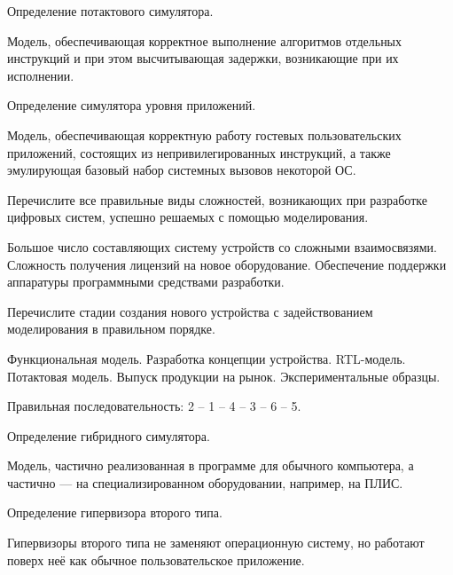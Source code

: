 \begin{questions}

\question[3] Определение потактового симулятора.
\begin{solution}[2cm]
Модель, обеспечивающая корректное выполнение алгоритмов отдельных инструкций и при этом высчитывающая задержки, возникающие при их исполнении.
\end{solution}

\question[3] Определение симулятора уровня приложений.
\begin{solution}[2cm]
Модель, обеспечивающая корректную работу гостевых пользовательских приложений, состоящих из непривилегированных инструкций, а также эмулирующая базовый набор системных вызовов некоторой ОС.
\end{solution}

\question[3] Перечислите все правильные виды сложностей, возникающих при разработке цифровых систем, успешно решаемых с помощью моделирования.
\begin{choices}
\correctchoice Большое число составляющих систему устройств со сложными взаимосвязями.
\choice Сложность получения лицензий на новое оборудование.
\correctchoice Обеспечение поддержки аппаратуры программными средствами разработки.
\end{choices}

\question[3] Перечислите стадии создания нового устройства с задействованием моделирования в правильном порядке.
\begin{choices}
\choice Функциональная модель.
\choice Разработка концепции устройства.
\choice RTL-модель.
\choice Потактовая модель.
\choice Выпуск продукции на рынок.
\choice Экспериментальные образцы.
\end{choices}
\begin{solution}
    Правильная последовательность: 2 -- 1 -- 4 -- 3 -- 6 -- 5.
\end{solution}

\question[3] Определение гибридного симулятора.
\begin{solution}[2cm]
Модель, частично реализованная в программе для обычного компьютера, а частично --- на специализированном оборудовании, например, на ПЛИС.
\end{solution}

\question[3] Определение гипервизора второго типа.
\begin{solution}[2cm]
Гипервизоры второго типа  не заменяют операционную систему, но работают поверх неё как обычное пользовательское приложение.
\end{solution}


\end{questions}
